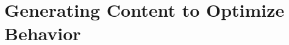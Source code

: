 \chapter{Generating Content to Optimize Behavior}
\label{chatper:Generating Content Leading to Optimal Behavior}


